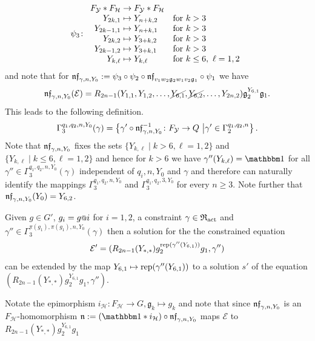 \documentclass[a4paper,11pt]{amsart}
\begin{document}
\[
 \psi_3\colon \begin{array}{r@{\;}l@{\quad}l}
                 F_{\mathcal{Y}}*F_{\mathcal{H}} &\to F_{\mathcal{Y}}*F_
                 {\mathcal H}\\
                 Y_{2k,1} &\mapsto Y_{n+k,2}&\text{for } k>3\\
                 Y_{2k-1,1} &\mapsto Y_{n+k,1}&\text{for } k>3\\
                 Y_{2k,2} &\mapsto Y_{3+k,2}&\text{for } k>3\\
                 Y_{2k-1,2} &\mapsto Y_{3+k,1}&\text{for } k>3\\
                 Y_{k,\ell} &\mapsto Y_{k,\ell}&\text{for } k\leq6,\ \ell=1,2\\
              \end{array} 
\]
and note that for $\mathfrak{nf}_{\gamma,n,Y_0} := \psi_3\circ
\psi_2\circ\mathfrak{nf}_{v_1w_2\mathfrak g_2w_1v_2\mathfrak g_1}\circ
\psi_1$ we have
\[\mathfrak{nf}_{\gamma,n,Y_0}(\mathcal{E})
=R_{2n-1}(Y_{1,1},Y_{1,2},\ldots,\cancel{Y_{6,1}},\cancel{Y_{6,2}},\ldots,Y_
{2n,2})\mathfrak{g}_2^{Y_{6,1}}\mathfrak{g}_1.\]
 This leads to the following definition.
\[\Gamma_3^{q_1,q_2,n,Y_0}(\gamma) = 
 \left\{\gamma' \circ \mathfrak{nf}_{\gamma,n,Y_0}^{-1}\colon F_{\mathcal{Y}}\to Q
 \ \middle \vert
 \gamma' \in \Gamma_2^{q_1,q_2,n} \right\}.\] 
Note that $\mathfrak{nf}_{\gamma,n,Y_0}$ fixes the sets $\{Y_{k,\ell} \mid k>6,\ell=1,2\}$
and $\{Y_{k,\ell} \mid k\leq 6,\ell=1,2\}$
and hence for $k>6$ we have $\gamma''(Y_{k,\ell})=\id$ for all
 $\gamma''\in\Gamma_3^{q_1,q_2,n,Y_0}(\gamma)$ independent of $q_i,n,Y_0$ and
 $\gamma$ and therefore can naturally identify the mappings $\Gamma_3^
 {q_1,q_2,n,Y_0}$ and $\Gamma_3^{q_1,q_2,3,Y_0}$ for every $n\geq 3$.
 Note further that $\mathfrak{nf}_{\gamma,n,Y_0}(Y_0)=Y_{6,2}$.

Given $g\in G'$, $g_i = g\at{i}$ for $i=1,2$, a constraint $\gamma\in\mathfrak{R}_
{\operatorname{act}}$
 and $\gamma''\in \Gamma_3^{\pi(g_1),\pi(g_1),n,Y_0}(\gamma)$ then  a solution for
the the constrained equation
\[\mathcal{E}'=(R_{2n-1}(Y_{*,*})g_2^{\operatorname{rep}(\gamma''({Y_{6,1}}))}
g_1,\gamma'') \]
can be extended by the map
${Y_{6,1}}\mapsto \operatorname{rep}(\gamma''({Y_{6,1}}))$ to a solution
$s'$ of the equation
$(R_{2n-1}(Y_{*,*}) g_2^{{Y_{6,1}}} g_1,\gamma'')$. 

Notate the epimorphism $i_{\mathcal{H}}\colon F_{\mathcal H} \to G,
 \mathfrak g_k \mapsto g_k$ and note that since $\mathfrak{nf}_{\gamma,n,Y_0}$ is an 
$F_{\mathcal{H}}$-homomorphism $\mathfrak n :=(\id * i_{\mathcal H}) \circ \nf_
{\gamma,n,Y_0}$
maps $\mathcal{E}$ to $R_{2n-1}(Y_{*,*}) g_2^
{{Y_{6,1}}}g_1$
\end{document}
